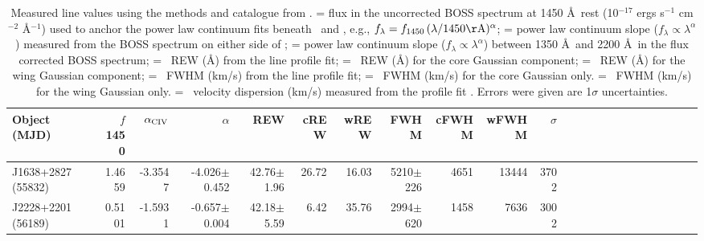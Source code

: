 \documentclass[a4paper,fleqn,usenatbib]{mnras}
\begin{document}
\begin{table*}
\begin{tabular}{ l rrrr rrrr rrrr rrrr rrrr rr|}
\hline
\hline 
Object (MJD)               & $f$1450 & $\alpha_{\rm C IV}$    & $\alpha$    & REW                       & cREW   &  wREW  & FWHM              & cFWHM  &  wFWHM  & $\sigma$     \\
\hline 
J1638+2827 (55832) & 1.4659    & -3.3547             & -4.026$\pm$0.452 & 42.76$\pm$1.96  & 26.72  & 16.03  & 5210$\pm$226 & 4651      & 13444    & 3702          \\
J2228+2201 (56189) & 0.5101    & -1.5931             & -0.657$\pm$0.004 & 42.18$\pm$5.59  &  6.42   & 35.76  & 2994$\pm$620 & 1458      &   7636    & 3002           \\
\hline
\end{tabular}
 \caption{
Measured line values using the methods and catalogue from \citet{Hamann2017}. 
 = flux in the uncorrected BOSS spectrum at 1450 \AA\ rest (10$^{-17}$ ergs s$^{-1}$ cm$^{-2}$ \AA$^{-1}$) used to anchor the power law continuum fits beneath \civ\ and \nv , 
                                     e.g., $f_{\lambda} = f_{1450}\, (\lambda /1450{\rm \AA})^{\alpha}$; 
 = power law continuum slope ($f_{\lambda}\propto \lambda^{\alpha}$) measured from the BOSS spectrum on either side of \civ ; 
\noindent {\tt $\alpha$}                            = power law continuum slope ($f_{\lambda}\propto \lambda^{\alpha}$) between 1350 \AA\ and 2200 \AA\ in the flux corrected BOSS spectrum; 
 = \civ\ REW (\AA ) from the line profile fit;
 = \civ\ REW (\AA ) for the core Gaussian component;
 = \civ\ REW (\AA ) for the wing Gaussian component; 
 = \civ\ FWHM (km/s) from the line profile fit; 
 = \civ\ FWHM (km/s) for the core Gaussian only.
 = \civ\ FWHM (km/s) for the wing Gaussian only.
\noindent {\tt $\sigma$} = \civ\ velocity dispersion (km/s) measured from the profile fit \citep{Peterson2004}.
Errors were given are 1$\sigma$ uncertainties. 
} 
 \label{tab:Ham17_lines}
\end{table*}
\end{document}
